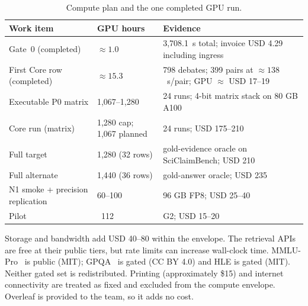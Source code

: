 \begin{center}
    \begin{table}[ht]
        \centering
        \caption{Compute plan and the one completed GPU run.}
        \renewcommand{\arraystretch}{1.6}
        \begin{tabular}{|p{}|p{}|p{}|}
            \hline
            Work item                              & GPU hours          & Evidence                          \\
            \hline
            Gate~0 (completed)                     & $\approx 1.0$      & 3,708.1~s total; invoice USD 4.29 including ingress \\
            \hline
            First Core row (completed)             & $\approx 15.3$     & 798 debates; 399 pairs at $\approx 138$~s/pair; GPU $\approx$ USD 17--19 \\
            \hline
            Executable P0 matrix                   & 1,067--1,280       & 24 runs; 4-bit matrix stack on 80 GB A100 \\
            \hline
            Core run (matrix)                      & 1,280 cap; 1,067 planned & 24 runs; USD 175--210 \\
            \hline
            Full target                      & 1,280 (32 rows)       & gold-evidence oracle on SciClaimBench; USD 210 \\
            \hline
            Full alternate                   & 1,440 (36 rows)       & gold-answer oracle; USD 235 \\
            \hline
            N1 smoke + precision replication & 60--100              & 96 GB FP8; USD 25--40 \\
            \hline
            Pilot                            & ~112                  & G2; USD 15--20 \\
            \hline
        \end{tabular}
        \label{tab:budget-phase}
    \end{table}
\end{center}

Storage and bandwidth add USD 40--80 within the envelope. The retrieval APIs are free at their public tiers, but rate limits can increase wall-clock time. MMLU-Pro~\cite{wang2024mmlupro} is public (MIT); GPQA~\cite{rein2024gpqa} is gated (CC BY 4.0) and HLE is gated (MIT). Neither gated set is redistributed. Printing (approximately \$15) and internet connectivity are treated as fixed and excluded from the compute envelope. Overleaf is provided to the team, so it adds no cost.

